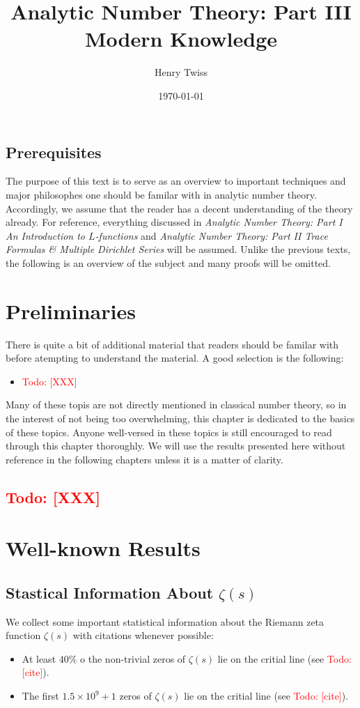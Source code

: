 \documentclass[12pt]{book}
\title{Analytic Number Theory: Part III \\ Modern Knowledge}
\author{Henry Twiss}
\date{\today}
\theoremstyle{definition}\newframedtheorem{method}{Method}
\newcommand{\z}{\zeta}
\newcommand{\x}{\times}
\newcommand{\<}{\langle}
\renewcommand{\>}{\rangle}
\newcommand{\todo}[1]{\textcolor{red}{\sf Todo: [#1]}}
\begin{document}
\maketitle
\thispagestyle{fancy}

\newpage

\section*{Prerequisites}
  The purpose of this text is to serve as an overview to important techniques and major philosophes one should be familar with in analytic number theory. Accordingly, we assume that the reader has a decent understanding of the theory already. For reference, everything discussed in \textit{Analytic Number Theory: Part I An Introduction to $L$-functions} and \textit{Analytic Number Theory: Part II Trace Formulas \& Multiple Dirichlet Series} will be assumed. Unlike the previous texts, the following is an overview of the subject and many proofs will be omitted.

\newpage

\tableofcontents

\newpage

\chapter{Preliminaries}
  There is quite a bit of additional material that readers should be familar with before atempting to understand the material. A good selection is the following:
  \begin{itemize}
    \item \todo{XXX}
  \end{itemize}
  Many of these topis are not directly mentioned in classical number theory, so in the interest of not being too overwhelming, this chapter is dedicated to the basics of these topics. Anyone well-versed in these topics is still encouraged to read through this chapter thoroughly. We will use the results presented here without reference in the following chapters unless it is a matter of clarity.
  \section{\todo{XXX}}
\chapter{Well-known Results}
  \section{Stastical Information About \texorpdfstring{$\z(s)$}{z(s)}}
    We collect some important statistical information about the Riemann zeta function $\z(s)$ with citations whenever possible:
    \begin{itemize}
      \item At least $40\%$ o the non-trivial zeros of $\z(s)$ lie on the critial line (see \todo{cite}).
      \item The first $1.5 \x 10^{9}+1$ zeros of $\z(s)$ lie on the critial line (see \todo{cite}).
    \end{itemize}
\end{document}
